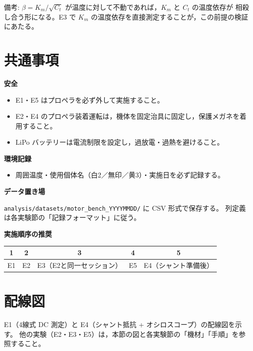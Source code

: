 \documentclass[a4paper,11pt]{ltjsarticle}
\newcommand{\expfield}[1]{\medskip\noindent\textbf{#1}\par\nobreak\smallskip\noindent}
\begin{document}
\medskip
\noindent
{\footnotesize 備考: $\beta = K_m/\sqrt{C_t}$ が温度に対して不動であれば，$K_m$ と $C_t$ の温度依存が
相殺し合う形になる。E3 で $K_m$ の温度依存を直接測定することが，この前提の検証にあたる。}

\section{共通事項}
\expfield{安全}
\begin{itemize}
  \item E1・E5 はプロペラを必ず外して実施すること。
  \item E2・E4 のプロペラ装着運転は，機体を固定治具に固定し，保護メガネを着用すること。
  \item LiPo バッテリーは電流制限を設定し，過放電・過熱を避けること。
\end{itemize}

\expfield{環境記録}
\begin{itemize}
  \item 周囲温度・使用個体名（白2／無印／黄3）・実施日を必ず記録する。
\end{itemize}

\expfield{データ置き場}
\texttt{analysis/datasets/motor\_bench\_YYYYMMDD/} に CSV 形式で保存する。
列定義は各実験節の「記録フォーマット」に従う。

\expfield{実施順序の推奨}
\begin{center}
\begin{tabular}{@{}ccccc@{}}
\toprule
1 & 2 & 3 & 4 & 5 \\
\midrule
E1 & E2 & E3（E2と同一セッション） & E5 & E4（シャント準備後） \\
\bottomrule
\end{tabular}
\end{center}

\section{配線図}
E1（4線式 DC 測定）と E4（シャント抵抗 + オシロスコープ）の配線図を示す。
他の実験（E2・E3・E5）は，本節の図と各実験節の「機材」「手順」を参照すること。
\end{document}
